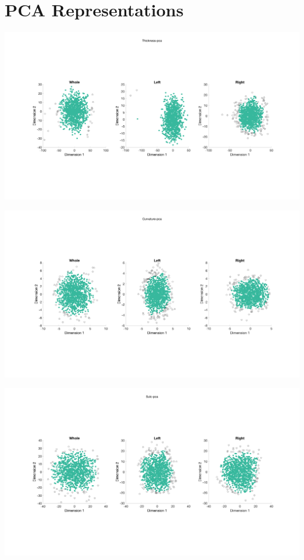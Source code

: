 \documentclass[]{article}
\begin{document}
\section{PCA Representations}
\centerline{\includegraphics[width=1\textwidth]{LowDReps_Thickness_pca.png}}
\vspace*{-1cm}
\centerline{\includegraphics[width=1\textwidth]{LowDReps_Curvature_pca.png}}
\vspace*{-1cm}
\centerline{\includegraphics[width=1\textwidth]{LowDReps_Sulc_pca.png}}
\newpage
\end{document}

